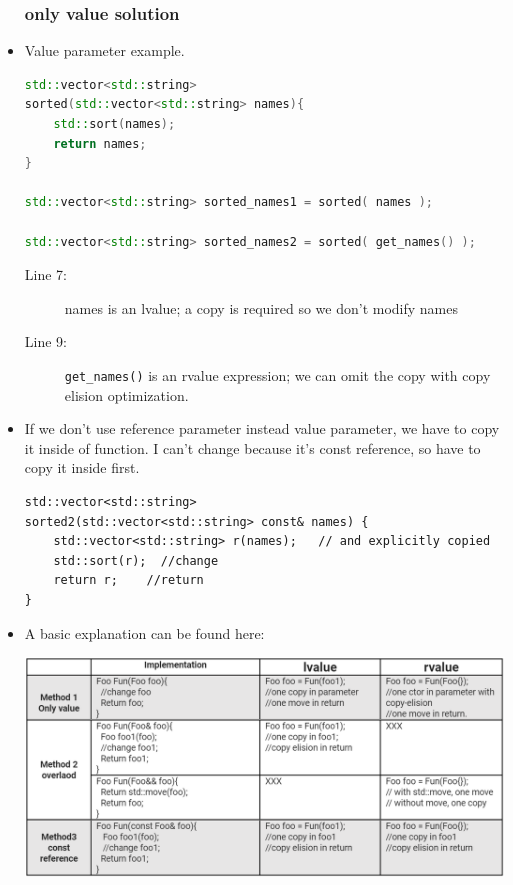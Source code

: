 \documentclass[a4paper,11pt,twoside]{book}
\begin{document}
\begin{itemize}
\subsubsection{only value solution}

\item Value parameter example.

\begin{lstlisting}[frame=single, language=c++]
std::vector<std::string> 
sorted(std::vector<std::string> names){
	std::sort(names);
	return names;
}

std::vector<std::string> sorted_names1 = sorted( names );

std::vector<std::string> sorted_names2 = sorted( get_names() );
\end{lstlisting}
\begin{description}
	\item[Line 7:] names is an lvalue; a copy is required so we don't modify names
	\item[Line 9:] \texttt{get\_names()} is an rvalue expression; we can omit the copy with copy elision optimization.
\end{description}

\item If we don't use reference parameter instead value parameter, we have to copy it inside of function. I can't change because it's const reference, so have to copy it inside first. 

\begin{lstlisting}[numbers=none]
std::vector<std::string> 
sorted2(std::vector<std::string> const& names) {
	std::vector<std::string> r(names);   // and explicitly copied
	std::sort(r);  //change
	return r;    //return
}
\end{lstlisting}





\item A basic explanation can be found here: \\
\begin{center}
	\includegraphics[scale=0.5]{pics/copy1.png}
\end{center}


\end{itemize}
\end{document}
